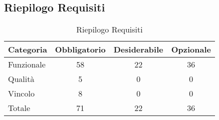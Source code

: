 \subsection{Riepilogo Requisiti}{ 
\renewcommand*{\arraystretch}{1.4} 
\begin{table}[h] 
 \begin{center} 
\begin{tabular}[c]{| p{2.5cm} | c | c | c |}  
\hline \textbf{Categoria} & \textbf{Obbligatorio} & \textbf{Desiderabile} & \textbf{Opzionale} \\ \hline 
Funzionale & 58 & 22 & 36\\ 
 \hline 
Qualità & 5 & 0 & 0\\ 
 \hline 
Vincolo & 8 & 0 & 0\\ 
 \hline 
Totale & 71 & 22 & 36\\ 
 \hline 
\end{tabular} 
 \caption{Riepilogo Requisiti\label{tab:riepilogo}}\end{center} 
 \end{table}}